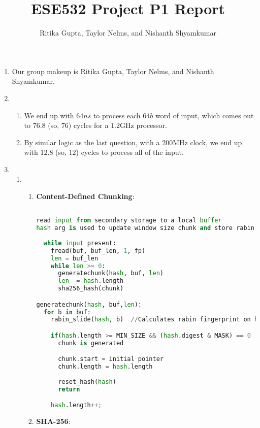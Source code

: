 \documentclass{article}
\title{ESE532 Project P1 Report}
\author{Ritika Gupta, Taylor Nelms, and Nishanth Shyamkumar}
\begin{document}
\maketitle


\begin{enumerate}
\item%
Our group makeup is Ritika Gupta, Taylor Nelms, and Nishanth Shyamkumar.

\item%
\begin{enumerate}[label=(\alph*)]
\item%
We end up with $64ns$ to process each $64b$ word of input, which comes out to $76.8$ (so, $76$) cycles for a $1.2$GHz processor.

\item%
By similar logic as the last question, with a $200$MHz clock, we end up with $12.8$ (so, $12$) cycles to process all of the input.

\end{enumerate}%

\item%
\begin{enumerate}[label=(\alph*)]
\item%
\begin{enumerate}[label=(\roman*)]
\item%
\textbf{Content-Defined Chunking}:
\begin{lstlisting}[language=python]

read input from secondary storage to a local buffer
hash arg is used to update window size chunk and store rabin fingerprint
  
  while input present:
    fread(buf, buf_len, 1, fp)
    len = buf_len
    while len >= 0:
      generatechunk(hash, buf, len)
      len -= hash.length
      sha256_hash(chunk)

generatechunk(hash, buf,len):
  for b in buf:
    rabin_slide(hash, b)  //Calculates rabin fingerprint on hash.window. 

    if(hash.length >= MIN_SIZE && (hash.digest & MASK) == 0 || hash.length >= MAX_SIZE) //MASK is a bitmask which detects 0 on LSB 20 bits.
      chunk is generated

      chunk.start = initial pointer
      chunk.length = hash.length
    
      reset_hash(hash)
      return

    hash.length++;  

\end{lstlisting}
\item%
\textbf{SHA-256}:
\begin{lstlisting}[language=python]


\end{lstlisting}
\end{enumerate}
\end{enumerate}
\end{enumerate}
\end{document}
